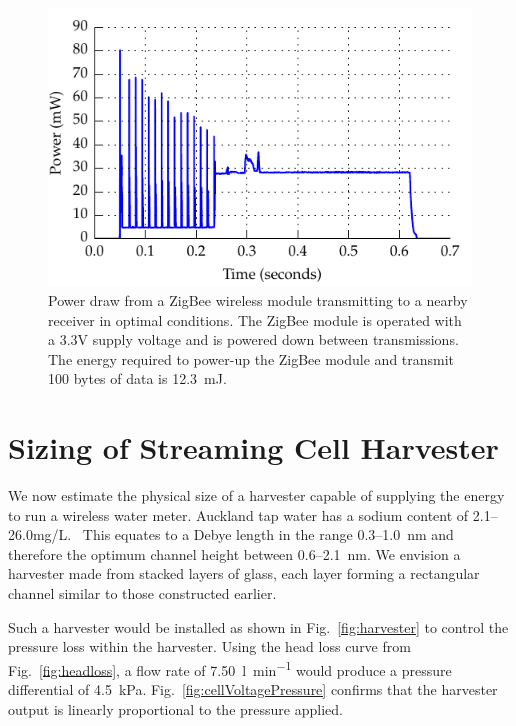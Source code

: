 \documentclass[10pt,final,journal]{IEEEtran}
\begin{document}
    \begin{figure}
        \begin{center}
        \includegraphics[width=\linewidth]{graph_XbeePower_reduced}
        \end{center}
        \caption{Power draw from a ZigBee wireless module transmitting to a nearby receiver in optimal conditions. The ZigBee module is operated with a 3.3V supply voltage and is powered down between transmissions. The energy required to power-up the ZigBee module and transmit 100 bytes of data is \SI{12.3}{\milli\joule}.}
        \label{fig:xbeePower}
    \end{figure}

    \section{Sizing of Streaming Cell Harvester}
    \label{sect:harvesterSize}
    We now estimate the physical size of a harvester capable of supplying the energy to run a wireless water meter.
    Auckland tap water has a sodium content of 2.1--26.0\thinspace mg/L.~\cite{WatercareNewZealand2012}
    This equates to a Debye length in the range 0.3--\SI{1.0}{\nano\metre} and therefore the optimum channel height between 0.6--\SI{2.1}{\nano\metre}.
    We envision a harvester made from stacked layers of glass, each layer forming a rectangular channel similar to those constructed earlier.

    Such a harvester would be installed as shown in Fig.~\ref{fig:harvester} to control the pressure loss within the harvester.
    Using the head loss curve from Fig.~\ref{fig:headloss}, a flow rate of \SI{7.50}{\litre\per\minute} would produce a pressure differential of \SI{4.5}{\kilo\pascal}.
    Fig.~\ref{fig:cellVoltagePressure} confirms that the harvester output is linearly proportional to the pressure applied.
\end{document}
